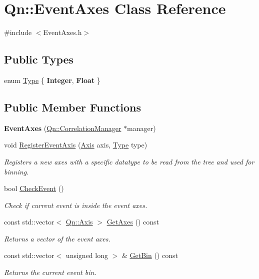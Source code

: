 \hypertarget{classQn_1_1EventAxes}{}\section{Qn\+:\+:Event\+Axes Class Reference}
\label{classQn_1_1EventAxes}


{\ttfamily \#include $<$Event\+Axes.\+h$>$}

\subsection*{Public Types}
\begin{DoxyCompactItemize}
\item 
enum \mbox{\hyperlink{classQn_1_1EventAxes_a81ebc6649920a462e33c176287b8706c}{Type}} \{ {\bfseries Integer}, 
{\bfseries Float}
 \}
\end{DoxyCompactItemize}
\subsection*{Public Member Functions}
\begin{DoxyCompactItemize}
\item 
\mbox{\label{classQn_1_1EventAxes_aaafb27e11f7e5feb8aebff6f18703f84}} 
{\bfseries Event\+Axes} (\mbox{\hyperlink{classQn_1_1CorrelationManager}{Qn\+::\+Correlation\+Manager}} $\ast$manager)
\item 
void \mbox{\hyperlink{classQn_1_1EventAxes_a4ddaaed5f02c92e5fa6696be9bf397e9}{Register\+Event\+Axis}} (\mbox{\hyperlink{classQn_1_1Axis}{Axis}} axis, \mbox{\hyperlink{classQn_1_1EventAxes_a81ebc6649920a462e33c176287b8706c}{Type}} type)
\begin{DoxyCompactList}\small\item\em Registers a new axes with a specific datatype to be read from the tree and used for binning. \end{DoxyCompactList}\item 
bool \mbox{\hyperlink{classQn_1_1EventAxes_a979183927f0ded4af0b1b22385550c2a}{Check\+Event}} ()
\begin{DoxyCompactList}\small\item\em Check if current event is inside the event axes. \end{DoxyCompactList}\item 
const std\+::vector$<$ \mbox{\hyperlink{classQn_1_1Axis}{Qn\+::\+Axis}} $>$ \mbox{\hyperlink{classQn_1_1EventAxes_a784b89dd78c0fe3a0fe6c57ef0835c23}{Get\+Axes}} () const
\begin{DoxyCompactList}\small\item\em Returns a vector of the event axes. \end{DoxyCompactList}\item 
const std\+::vector$<$ unsigned long $>$ \& \mbox{\hyperlink{classQn_1_1EventAxes_a76d3881ef0c333be3044c6b0b706e7e7}{Get\+Bin}} () const
\begin{DoxyCompactList}\small\item\em Returns the current event bin. \end{DoxyCompactList}\end{DoxyCompactItemize}


